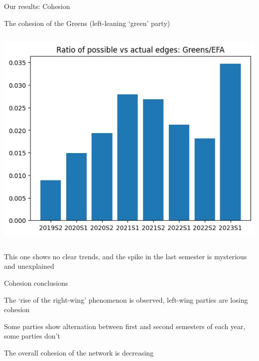\documentclass{beamer}
\begin{document}
\begin{frame}{Our results: Cohesion}
	
	The cohesion of the Greens (left-leaning `green' party)
	
	\pause
	
	\vspace{0.5cm}
	
	\begin{columns}
		
		\begin{column}{0.4\textwidth}
			\includegraphics[width=\textwidth]{img/coh_greens.png}
		\end{column}
		
		
	\end{columns}
	
	\vspace{0.5cm}
	
	\pause This one shows no clear trends\pause, and the spike in the last semester is mysterious and unexplained
\end{frame}

\begin{frame}{Cohesion conclusions}
	
	\pause The `rise of the right-wing' phenomenon is observed\pause, left-wing parties are losing cohesion
	
	\vspace{0.5cm}
	
	\pause Some parties show alternation between first and second semesters of each year, some parties don't
	
	\vspace{0.5cm}
	
	\pause The overall cohesion of the network is decreasing
	
\end{frame}
\end{document}
